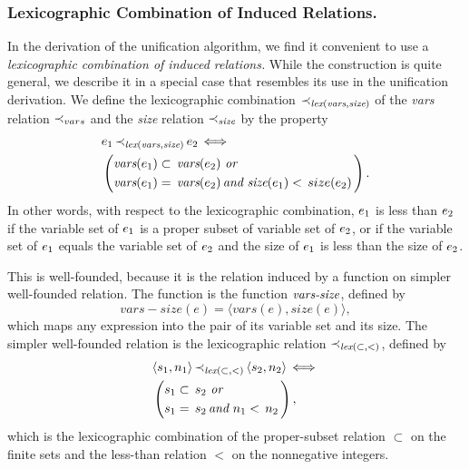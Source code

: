 \documentclass[runningheads]{llncs}
\DeclareMathOperator{\uand}{\emph{and}\,}
\DeclareMathOperator{\uor}{\emph{or}\,}
\DeclareMathOperator{\uiff}{\iff}
\DeclareMathOperator{\lex}{\emph{lex}}
\begin{document}
   \subsubsection{Lexicographic  Combination of Induced Relations.}  In the derivation of the unification algorithm, we find it convenient to use a \emph{lexicographic combination of induced relations.}   While the construction is quite general, we describe it in a special case that resembles its use in the unification derivation.  We define the lexicographic combination $\expsub{\prec}{\lex(\vars,\size)}$ of the \emph{vars} relation ${\prec}_{vars}$ and the \emph{size} relation  ${\prec}_{\emph{size}}$ by the property
   \begin{alignat*}{2}
  \begin{split}
  &\e{1} \, \expsub{\prec}{\lex(\vars,\size)}\, \e{2}
  \uiff \\
  &\left(\begin{aligned}
  &\vars(\e{1}) \subset \, \vars(\e{2})\, \uor \, \\
  &\vars(\e{1}) = \, \vars(\e{2}) \uand
 \size(\e{1}) < \, size(\e{2})\,
  \end{aligned}\right).
  \end{split}
  \end{alignat*}
  In other words, with respect to the lexicographic combination, 
$e_{1}$ is less than $e_{2}$ if the variable set of $e_{1}$ is a proper subset of variable set of $e_{2}$, or if the variable set of $e_{1}$ equals the variable set of $e_{2}$ and the size of $e_{1}$ is  less than the size of $e_{2}$.

This is well-founded, because it is the relation induced by a function on simpler well-founded relation.  The function is the function $\emph{vars-size}$,  defined by 
\[vars\!\!-\!\!size(e) = \langle vars(e), size(e) \rangle,\]
which maps any expression into the pair of its variable set and its size. 
The simpler well-founded relation is the lexicographic relation $\expsub{\prec}{\lex(\subset, <)}$, defined by 
\begin{alignat*}{2}
  \begin{split}
  &\langle s_{1}, n_{1}\rangle \,  \expsub{\prec}{\lex(\subset, <)}\, \langle s_{2},n_{2} \rangle
  \uiff \\
  &\left(\begin{aligned}
  &s_{1} \subset \, s_{2}\, \uor \, \\
  &s_{1} = \, s_{2} \uand
 n_{1} < \, n_{2}\,
  \end{aligned}\right),
  \end{split}
  \end{alignat*} 
 which is the lexicographic combination of the proper-subset relation $\subset$ on the finite sets and the less-than relation $<$ on the nonnegative integers. 
\end{document}
